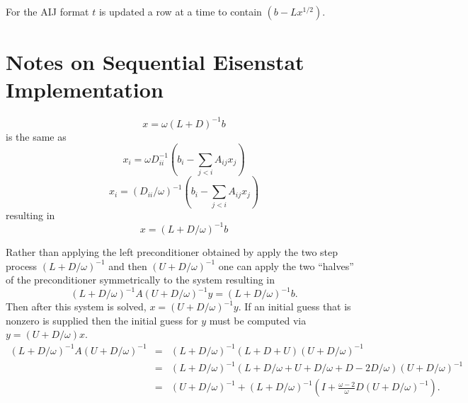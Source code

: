 \documentclass[11pt,english,pdftex]{article}
\begin{document}
For the AIJ format $t$ is updated a row at a time to contain $ (b - Lx^{1/2}).$


\section*{Notes on Sequential Eisenstat Implementation}


\[
  x = \omega (L + D)^{-1}b
\]
is the same as
\[
   x_i = \omega D_{ii}^{-1}(b_i - \sum_{j<i} A_{ij} x_j)
\]
\[
   x_i = (D_{ii}/\omega)^{-1}(b_i - \sum_{j<i} A_{ij} x_j)
\]
resulting in
\[
  x =  (L + D/\omega)^{-1}b
\]

Rather than applying the left preconditioner obtained by apply the two step process $ (L + D/\omega)^{-1} $ and then $ (U + D/\omega)^{-1} $
one can apply the two ``halves'' of the preconditioner symmetrically to the system resulting in
\[
 (L + D/\omega)^{-1} A (U + D/\omega)^{-1} y = (L + D/\omega)^{-1} b.
\]
Then after this system is solved, $ x = (U + D/\omega)^{-1} y$. If an initial guess that is nonzero is supplied then the
initial guess for $ y$ must be computed via $ y = (U + D/\omega) x$.
\begin{eqnarray*}
 (L + D/\omega)^{-1} A (U + D/\omega)^{-1} & =  & (L + D/\omega)^{-1} (L + D + U) (U + D/\omega)^{-1} \\
  & = &  (L + D/\omega)^{-1} (L + D/\omega + U + D/\omega + D - 2D/\omega) (U + D/\omega)^{-1} \\
  & = &  (U + D/\omega)^{-1} + (L+D/\omega)^{-1}(I + \frac{\omega - 2}{\omega}D(U + D/\omega)^{-1}).
\end{eqnarray*}
\end{document}

